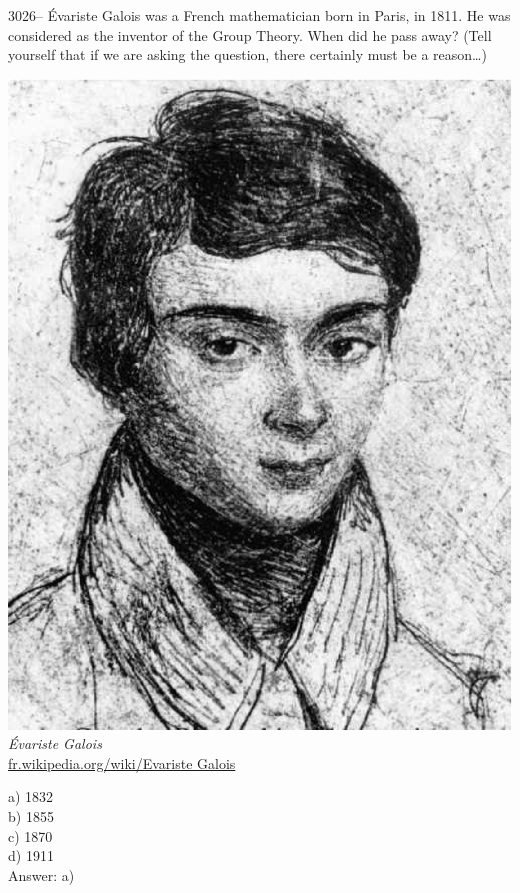 \documentclass[letterpaper, 12pt]{article}
\begin{document}
3026-- \'Evariste Galois was a French mathematician born in Paris, in 1811. He was considered as the inventor of the Group Theory. When did he pass away? (Tell yourself that if we are asking the question, there certainly must be a reason\dots)\\

\begin{center}
\includegraphics[scale=0.15]{Evariste_galois.eps}\\
\emph{{\small \'Evariste Galois}}\\
\href{http://fr.wikipedia.org/wiki/Evariste Galois}{fr.wikipedia.org/wiki/Evariste Galois}
\end{center}

a) 1832\\
b) 1855\\
c) 1870\\
d) 1911\\

Answer: a)\\
\end{document}
